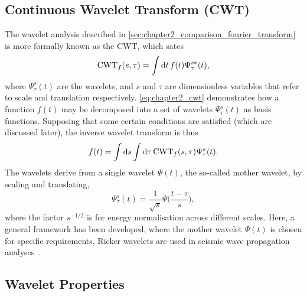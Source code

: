 

\subsection{Continuous Wavelet Transform (CWT)}\label{sec:chapter2_continuous_wavelet_transform}

The wavelet analysis described in \cref{sec:chapter2_comparison_fourier_transform} is more formally known as the CWT, which sates
%
\begin{equation}\label{eq:chapter2_cwt}
    \text{CWT}_{f}(s,\tau)
    = \int\dd{t} f(t) \Psi^{s\ast}_{\tau}(t),
\end{equation}
%
where \(\Psi^{s}_{\tau}(t)\) are the wavelets, and \(s\) and \(\tau{}\) are dimensionless variables that refer to scale and translation respectively.
\cref{eq:chapter2_cwt} demonstrates how a function \(f(t)\) may be decomposed into a set of wavelets \(\Psi^{s}_{\tau}(t)\) as basis functions.
Supposing that some certain conditions are satisfied (which are discussed later), the inverse wavelet transform is thus
%
\begin{equation}
    f(t)
    = \int\dd{s} \int\dd{\tau} \text{CWT}_{f}(s,\tau) \Psi^{s}_{\tau}(t).
\end{equation}
%
The wavelets derive from a single wavelet \(\Psi(t)\), the so-called mother wavelet, by scaling and translating, \ie{}
%
\begin{equation}\label{eq:chapter2_mother_wavelet}
    \Psi^{s}_{\tau}(t)
    = \frac{1}{\sqrt{s}} \Psi\bigg(\frac{t-\tau}{s}\bigg),
\end{equation}
%
where the factor \(s^{-1/2}\) is for energy normalisation across different scales.
Here, a general framework has been developed, where the mother wavelet \(\Psi(t)\) is chosen for specific requirements, \eg{} Ricker wavelets are used in seismic wave propagation analyses~\cite{Wang2014}.

\subsection{Wavelet Properties}

